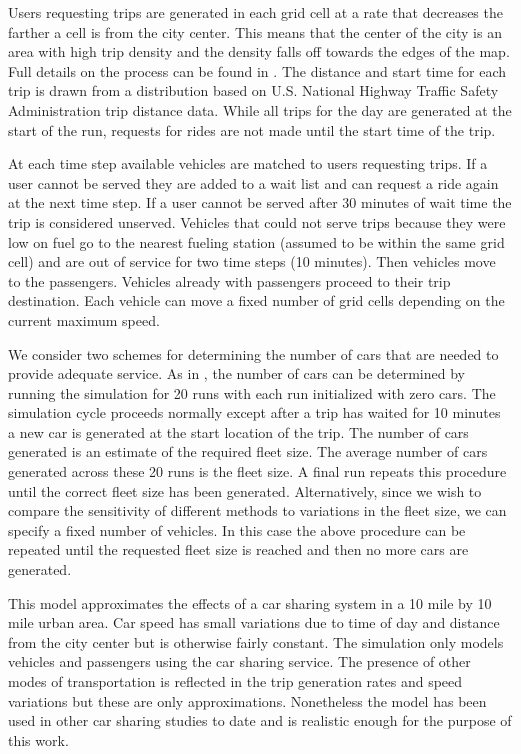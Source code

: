 \documentclass[letterpaper]{article}
\begin{document}
Users requesting trips are generated in each grid cell at a rate that decreases the farther a cell is from the city center. This means that the center of the city is an area with high trip density and the density falls off towards the edges of the map. Full details on the process can be found in \cite{fagnant2014travel}. The distance and start time for each trip is drawn from a distribution based on U.S. National Highway Traffic Safety Administration trip distance data. While all trips for the day are generated at the start of the run, requests for rides are not made until the start time of the trip. 

At each time step available vehicles are matched to users requesting trips. If a user cannot be served they are added to a wait list and can request a ride again at the next time step. If a user cannot be served after 30 minutes of wait time the trip is considered unserved. Vehicles that could not serve trips because they were low on fuel go to the nearest fueling station (assumed to be within the same grid cell) and are out of service for two time steps (10 minutes). Then vehicles move to the passengers. Vehicles already with passengers proceed to their trip destination. Each vehicle can move a fixed number of grid cells depending on the current maximum speed.

We consider two schemes for determining the number of cars that are needed to provide adequate service. As in \cite{fagnant2014travel}, the number of cars can be determined by running the simulation for 20 runs with each run initialized with zero cars. The simulation cycle proceeds normally except after a trip has waited for 10 minutes a new car is generated at the start location of the trip. The number of cars generated is an estimate of the required fleet size. The average number of cars generated across these 20 runs is the fleet size. A final run repeats this procedure until the correct fleet size has been generated. Alternatively, since we wish to compare the sensitivity of different methods to variations in the fleet size, we can specify a fixed number of vehicles. In this case the above procedure can be repeated until the requested fleet size is reached and then no more cars are generated.

This model approximates the effects of a car sharing system in a 10 mile by 10 mile urban area. Car speed has small variations due to time of day and distance from the city center but is otherwise fairly constant. The simulation only models vehicles and passengers using the car sharing service. The presence of other modes of transportation is reflected in the trip generation rates and speed variations but these are only approximations. Nonetheless the model has been used in other car sharing studies \cite{fagnant2015operations} to date and is realistic enough for the purpose of this work. 
\end{document}
